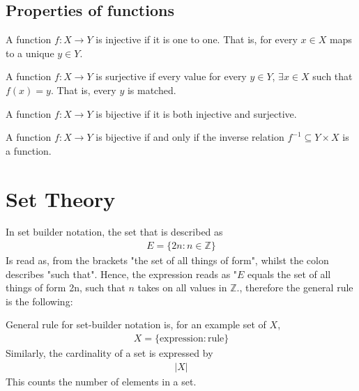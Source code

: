 \documentclass[a4paper]{article}
\theoremstyle{plain}
\newtheorem{thm}{Theorem}[section]
\theoremstyle{definition}
\newtheorem{defn}{Definition}[section]
\theoremstyle{remark}
\begin{document}
\subsection{Properties of functions}
\begin{tcolorbox}[colback=black!3!white,colframe=black!60!white,title=\begin{defn}Injectivity \label{Injectivity}\end{defn}]
A function $f:X \to Y$ is injective if it is one to one. That is, for every $x \in X$ maps to a unique  $y \in Y$. 
\end{tcolorbox}
\begin{tcolorbox}[colback=black!3!white,colframe=black!60!white,title=\begin{defn}Surjectivity \label{Surjectivity}\end{defn}]
A function $f:X \to Y$ is surjective if every value for every $y \in Y$, $\exists x \in X$ such that $f(x)=y$. That is, every $y$ is matched.
\end{tcolorbox}
\begin{tcolorbox}[colback=black!3!white,colframe=black!60!white,title=\begin{defn}Bijectivity \label{Bijectivity}\end{defn}]
A function $f:X \to Y$ is bijective if it is both injective and surjective. 
\end{tcolorbox}
\begin{tcolorbox}[colback=black!3!white,colframe=black!60!white,title=\begin{thm}Inverse bijectivity \label{Inverse bijectivity}\end{thm}]
A function $f:X \to Y$ is bijective if and only if the inverse relation $f^{-1} \subseteq Y \times X$ is a function.
\end{tcolorbox}
\section{Set Theory}
In set builder notation, the set that is described as
\begin{align*}
	E = \{2n : n \in \mathbb{Z}\}
\end{align*}
Is read as, from the brackets "the set of all things of form", whilst the colon describes "such that". Hence, the expression reads as "$E$ equals the set of all things of form 2n, such that $n$ takes on all values in $\mathbb{Z}$., therefore the general rule is the following:
\begin{tcolorbox}[colback=black!3!white,colframe=black!60!white,title=\begin{defn}Set Builder Notation \label{Set Builder Notation}\end{defn}]
General rule for set-builder notation is, for an example set of $X$,
\begin{align}
	X = \{\text{expression}:\text{rule}\}
\end{align}
Similarly, the cardinality of a set is expressed by
\begin{align}
	|X|
\end{align}
This counts the number of elements in a set.
\end{tcolorbox}
\end{document}
